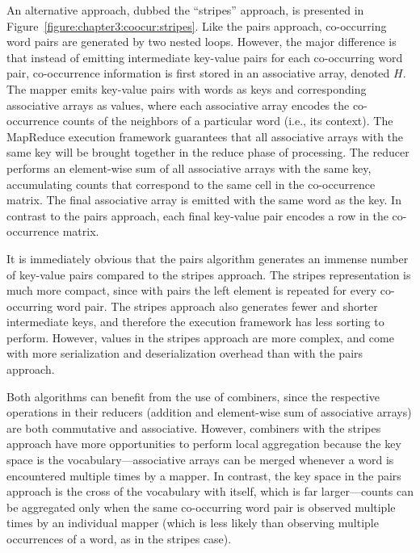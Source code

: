 An alternative approach, dubbed the ``stripes'' approach, is presented
in Figure~\ref{figure:chapter3:coocur:stripes}.  Like the pairs
approach, co-occurring word pairs are generated by two nested loops.
However, the major difference is that instead of emitting intermediate
key-value pairs for each co-occurring word pair, co-occurrence
information is first stored in an associative array, denoted $H$.  The
mapper emits key-value pairs with words as keys and corresponding
associative arrays as values, where each associative array encodes the
co-occurrence counts of the neighbors of a particular word (i.e., its
context).  The MapReduce execution framework guarantees that all
associative arrays with the same key will be brought together in the
reduce phase of processing.  The reducer performs an element-wise sum
of all associative arrays with the same key, accumulating counts that
correspond to the same cell in the co-occurrence matrix.  The final
associative array is emitted with the same word as the key.  In
contrast to the pairs approach, each final key-value pair encodes a
row in the co-occurrence matrix.

It is immediately obvious that the pairs algorithm generates an
immense number of key-value pairs compared to the stripes approach.
The stripes representation is much more compact, since with pairs the
left element is repeated for every co-occurring word pair.  The
stripes approach also generates fewer and shorter intermediate keys,
and therefore the execution framework has less sorting to perform.
However, values in the stripes approach are more complex, and come
with more serialization and deserialization overhead than with the
pairs approach.

Both algorithms can benefit from the use of combiners, since the
respective operations in their reducers (addition and element-wise sum
of associative arrays) are both commutative and associative.  However,
combiners with the stripes approach have more opportunities to perform
local aggregation because the key space is the
vocabulary---associative arrays can be merged whenever a word is
encountered multiple times by a mapper.  In contrast, the key space in
the pairs approach is the cross of the vocabulary with itself, which
is far larger---counts can be aggregated only when the same
co-occurring word pair is observed multiple times by an individual
mapper (which is less likely than observing multiple occurrences of a
word, as in the stripes case).

